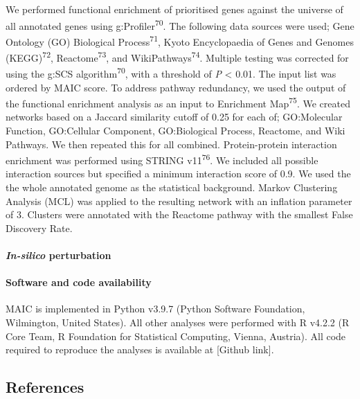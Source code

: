 \documentclass[
  11,
  a4paper,
]{article}
\let\oldparagraph\paragraph
\renewcommand{\paragraph}[1]{\oldparagraph{#1}\mbox{}}
\begin{document}
We performed functional enrichment of prioritised genes against the
universe of all annotated genes using g:Profiler\textsuperscript{70}.
The following data sources were used; Gene Ontology (GO) Biological
Process\textsuperscript{71}, Kyoto Encyclopaedia of Genes and Genomes
(KEGG)\textsuperscript{72}, Reactome\textsuperscript{73}, and
WikiPathways\textsuperscript{74}. Multiple testing was corrected for
using the g:SCS algorithm\textsuperscript{70}, with a threshold of
\emph{P} \textless{} 0.01. The input list was ordered by MAIC score. To
address pathway redundancy, we used the output of the functional
enrichment analysis as an input to Enrichment Map\textsuperscript{75}.
We created networks based on a Jaccard similarity cutoff of 0.25 for
each of; GO:Molecular Function, GO:Cellular Component, GO:Biological
Process, Reactome, and Wiki Pathways. We then repeated this for all
combined. Protein-protein interaction enrichment was performed using
STRING v11\textsuperscript{76}. We included all possible interaction
sources but specified a minimum interaction score of 0.9. We used the
the whole annotated genome as the statistical background. Markov
Clustering Analysis (MCL) was applied to the resulting network with an
inflation parameter of 3. Clusters were annotated with the Reactome
pathway with the smallest False Discovery Rate.

\hypertarget{in-silico-perturbation-1}{%
\paragraph{\texorpdfstring{\emph{In-silico}
perturbation}{In-silico perturbation}}\label{in-silico-perturbation-1}}

\hypertarget{software-and-code-availability}{%
\paragraph{Software and code
availability}\label{software-and-code-availability}}

MAIC is implemented in Python v3.9.7 (Python Software Foundation,
Wilmington, United States). All other analyses were performed with R
v4.2.2 (R Core Team, R Foundation for Statistical Computing, Vienna,
Austria). All code required to reproduce the analyses is available at
{[}Github link{]}.

\newpage

\hypertarget{references}{%
\subsection{References}\label{references}}
\end{document}
